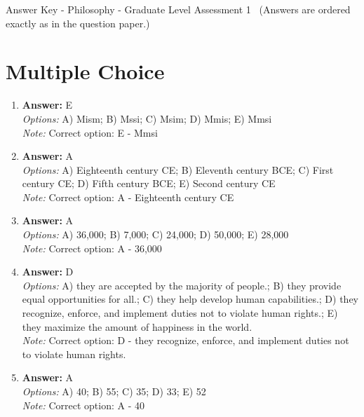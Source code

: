 \documentclass[12pt]{article}
\begin{document}
\begin{center}
Answer Key - Philosophy - Graduate Level Assessment 1 \
\small (Answers are ordered exactly as in the question paper.)
\end{center}

\section*{Multiple Choice}
\begin{enumerate}[label=\arabic*.]
\item \textbf{Answer:} E
\\ \textit{Options:} A) Mism; B) Mssi; C) Msim; D) Mmis; E) Mmsi
\\ \textit{Note:} Correct option: E - Mmsi
\item \textbf{Answer:} A
\\ \textit{Options:} A) Eighteenth century CE; B) Eleventh century BCE; C) First century CE; D) Fifth century BCE; E) Second century CE
\\ \textit{Note:} Correct option: A - Eighteenth century CE
\item \textbf{Answer:} A
\\ \textit{Options:} A) 36,000; B) 7,000; C) 24,000; D) 50,000; E) 28,000
\\ \textit{Note:} Correct option: A - 36,000
\item \textbf{Answer:} D
\\ \textit{Options:} A) they are accepted by the majority of people.; B) they provide equal opportunities for all.; C) they help develop human capabilities.; D) they recognize, enforce, and implement duties not to violate human rights.; E) they maximize the amount of happiness in the world.
\\ \textit{Note:} Correct option: D - they recognize, enforce, and implement duties not to violate human rights.
\item \textbf{Answer:} A
\\ \textit{Options:} A) 40; B) 55; C) 35; D) 33; E) 52
\\ \textit{Note:} Correct option: A - 40
\end{enumerate}
\end{document}
